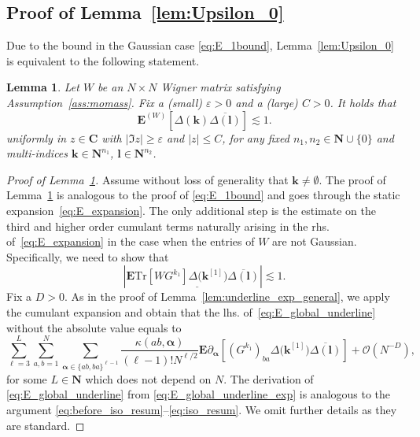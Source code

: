 \documentclass[10pt]{amsart}
\newtheorem{lemma}[theorem]{Lemma}
\numberwithin{equation}{section}
\newcommand{\E}{\mathbf{E}}
\newcommand{\C}{\mathbf{C}}
\newcommand{\N}{\mathbf{N}}
\newcommand{\Tr}{\mathrm{Tr}}
\begin{document}
\subsection{Proof of Lemma~\ref{lem:Upsilon_0}}\label{app:Upsilon_0}

Due to the bound in the Gaussian case \eqref{eq:E_1bound}, Lemma~\ref{lem:Upsilon_0} is equivalent to the following statement.

\begin{lemma}\label{lem:E_global} Let $W$ be an $N\times N$ Wigner matrix satisfying Assumption~\ref{ass:momass}. Fix a (small) $\varepsilon>0$ and a (large) $C>0$. It holds that
\begin{equation}
\E^{(W)} \left[\Delta(\bm{k})\overline{\Delta(\bm{l})}\right]\lesssim 1.
\end{equation}
uniformly in $z\in \C$ with $|\Im z|\ge \varepsilon$ and $|z|\le C$, for any fixed $n_1,n_2\in\N\cup\{0\}$ and multi-indices $\bm{k}\in\N^{n_1}$, $\bm{l}\in\N^{n_2}$.
\end{lemma}

\begin{proof}[Proof of Lemma~\ref{lem:E_global}] Assume without loss of generality that $\bm{k}\neq \emptyset$. The proof of Lemma~\ref{lem:E_global} is analogous to the proof of \eqref{eq:E_1bound} and goes through the static expansion~\eqref{eq:E_expansion}. The only additional step is the estimate on the third and higher order cumulant terms naturally arising in the rhs. of~\eqref{eq:E_expansion} in the case when the entries of $W$ are not Gaussian. Specifically, we need to show that
\begin{equation}
\left\vert\E \underline{\Tr [WG^{k_1}]\Delta\big(\bm{k}^{[1]}\big)\overline{\Delta(\bm{l})}}\right\vert\lesssim 1.
\label{eq:E_global_underline}
\end{equation}
Fix a $D>0$. As in the proof of Lemma~\ref{lem:underline_exp_general}, we apply the cumulant expansion and obtain that the lhs. of~\eqref{eq:E_global_underline} without the absolute value equals to
\begin{equation}
\sum_{\ell=3}^L \sum_{a,b=1}^N\sum_{\bm{\alpha}\in\{ab,ba\}^{\ell-1}}\frac{\kappa(ab,\bm{\alpha})}{(\ell-1)!N^{\ell/2}}\E \partial_{\bm{\alpha}} \left[(G^{k_1})_{ba}\Delta\big(\bm{k}^{[1]}\big)\overline{\Delta(\bm{l})}\right] +\mathcal{O}\left(N^{-D}\right),
\label{eq:E_global_underline_exp}
\end{equation}
for some $L\in\N$ which does not depend on $N$. The derivation of \eqref{eq:E_global_underline} from \eqref{eq:E_global_underline_exp} is analogous to the argument \eqref{eq:before_iso_resum}--\eqref{eq:iso_resum}. We omit further details as they are standard.
\end{proof}
\end{document}
